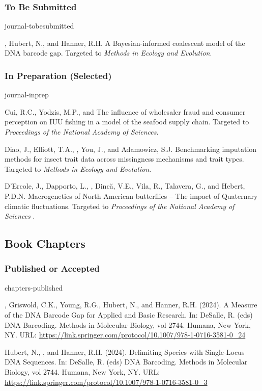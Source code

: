 \subsubsection{To Be Submitted}
\begin{revlist}{journal-tobesubmitted}
\item \me, Hubert, N., and Hanner, R.H. A Bayesian-informed coalescent model of the
  DNA barcode gap. Targeted to \textit{Methods in Ecology and Evolution}.
\end{revlist}

\subsubsection{In Preparation (Selected)}
\begin{revlist}[itemsep=0.45\baselineskip]{journal-inprep}
\item \dsup Cui, R.C., Yodzis, M.P., and \me The influence of wholesaler fraud and consumer perception on IUU fishing in a model of the seafood supply chain.
  Targeted to \textit{Proceedings of the National Academy of Sciences}.
\item Diao, J., Elliott, T.A., \me, You, J., and Adamowicz, S.J. Benchmarking imputation
  methods for insect trait data across missingness mechanisms and trait types.
  Targeted to \textit{Methods in Ecology and Evolution}.
\item D'Ercole, J., Dapporto, L., \me, Dincă, V.E., Vila, R., Talavera, G., and
  Hebert, P.D.N. Macrogenetics of North American butterflies -- The impact of
  Quaternary climatic fluctuations. Targeted to \textit{ Proceedings of the National Academy of Sciences }.
\end{revlist}

\subsection{Book Chapters}
\subsubsection{Published or Accepted}
\begin{revlist}[itemsep=0.45\baselineskip]{chapters-published}
\item \me, Griswold, C.K., Young, R.G., Hubert, N., and Hanner, R.H. (2024). A
  Measure of the DNA Barcode Gap for Applied and Basic Research. In: DeSalle, R.
  (eds) DNA Barcoding. Methods in Molecular Biology, vol 2744. Humana, New York,
  NY. URL: \url{https://link.springer.com/protocol/10.1007/978-1-0716-3581-0_24}
\item Hubert, N., \me, and Hanner, R.H. (2024). Delimiting Species with
  Single-Locus DNA Sequences. In: DeSalle, R. (eds) DNA Barcoding. Methods in
  Molecular Biology, vol 2744. Humana, New York, NY. URL:
  \url{https://link.springer.com/protocol/10.1007/978-1-0716-3581-0_3}
\end{revlist}

